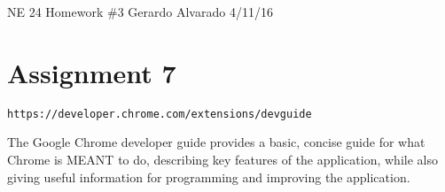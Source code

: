 NE 24 Homework \#3 Gerardo Alvarado 4/11/16 \section*{Assignment 7 }

{\tt https\+://developer.\+chrome.\+com/extensions/devguide}

The Google Chrome developer guide provides a basic, concise guide for what Chrome is M\+E\+A\+NT to do, describing key features of the application, while also giving useful information for programming and improving the application. 